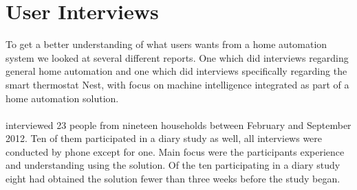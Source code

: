 \section{User Interviews}
\label{sec:interviewReports}
To get a better understanding of what users wants from a home automation system we looked at several different reports. One \cite{HAInterviews} which did interviews regarding general home automation and one which did interviews specifically regarding the smart thermostat Nest\cite{AdaptiveInterviews}, with focus on machine intelligence integrated as part of a home automation solution. 
\\\\
\citep{AdaptiveInterviews} interviewed 23 people from nineteen households between February  and September 2012. Ten of them participated in a diary study as well, all interviews were conducted by phone except for one. Main focus were the participants experience and understanding using the solution. Of the ten participating in a diary study eight had obtained the solution fewer than three weeks before the study began. 
